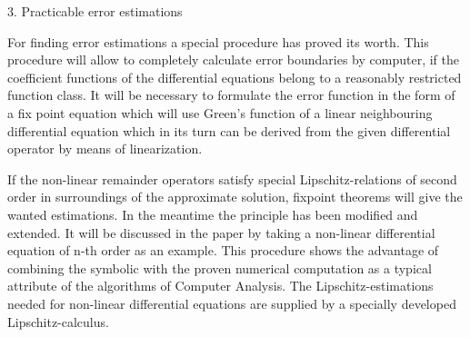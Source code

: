 3.	Practicable error estimations

For finding error estimations a special procedure has proved its worth.
This procedure will allow to completely calculate error boundaries by
computer, if the coefficient functions of the differential equations belong
to a reasonably restricted function class.  It will be necessary to
formulate the error function in the form of a fix point equation which will
use Green's function of a linear neighbouring differential equation which
in its turn can be derived from the given differential operator by means of
linearization.

If the non-linear remainder operators satisfy special Lipschitz-relations
of second order in surroundings of the approximate solution, fixpoint
theorems will give the wanted estimations. In the meantime the principle has
been modified and extended. It will be discussed in the paper by taking a
non-linear differential equation of n-th order as an example.
This procedure shows the advantage of combining the symbolic with the proven
numerical computation as a typical attribute of the algorithms of Computer
Analysis.
The Lipschitz-estimations needed for non-linear differential equations are
supplied by a specially developed Lipschitz-calculus.



